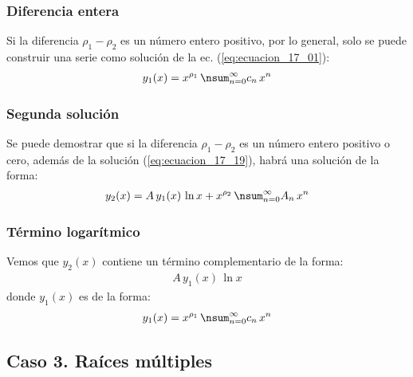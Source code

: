 \documentclass[12pt]{beamer}
\begin{document}
\begin{frame}
\frametitle{Diferencia entera}
Si la diferencia $\rho_{1} - \rho_{2}$ es un número entero positivo, por lo general, solo se puede construir una serie como solución de la ec. (\ref{eq:ecuacion_17_01}):
\pause
\begin{align}
y_{1}(x) = x^{\rho_{1}} \, \nsum_{n=0}^{\infty} c_{n} \, x^{n}
\label{eq:ecuacion_17_19}
\end{align}
\end{frame}
\begin{frame}
\frametitle{Segunda solución}
Se puede demostrar que si la diferencia $\rho_{1} - \rho_{2}$ es un número entero positivo o cero, además de la solución (\ref{eq:ecuacion_17_19}), habrá una solución de la forma:
\pause
\begin{align}
y_{2}(x) = A \, y_{1}(x) \, \ln x + x^{\rho_{2}} \, \nsum_{n=0}^{\infty} A_{n} \, x^{n}
\label{eq:ecuacion_17_20}
\end{align}
\end{frame}
\begin{frame}
\frametitle{Término logarítmico}
Vemos que $y_{2}(x)$ contiene un término complementario de la forma:
\pause
\begin{align*}
A \, y_{1} (x) \, \ln x
\end{align*}
\pause
donde $y_{1}(x)$ es de la forma:
\begin{align*}
y_{1}(x) = x^{\rho_{1}} \, \nsum_{n=0}^{\infty} c_{n} \, x^{n}
\end{align*}
\end{frame}

\subsection{Caso 3. Raíces múltiples}
\end{document}
